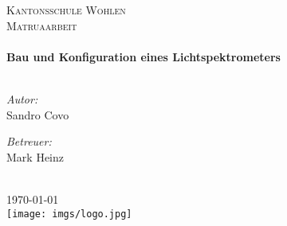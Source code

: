 \begin{titlepage}
\begin{center}

\textsc{\LARGE Kantonsschule Wohlen}\\[1.5cm] %
\textsc{\Large Matruaarbeit}\\[0.5cm] %

\HRule \\[0.4cm] %
{\huge \bfseries Bau und Konfiguration eines Lichtspektrometers}\\[0.4cm] %
\HRule \\[1.5cm] %

\begin{minipage}{0.4\textwidth}
\begin{flushleft} \large
\emph{Autor:}\\
{Sandro Covo} %
\end{flushleft}
\end{minipage}
\begin{minipage}{0.4\textwidth}
\begin{flushright} \large
\emph{Betreuer:} \\
{Mark Heinz} %
\end{flushright}
\end{minipage}\\[3cm]
 
{\large \today}\\[4cm] %
\texttt{[image: imgs/logo.jpg]} %
 
\vfill
\end{center}

\end{titlepage}
